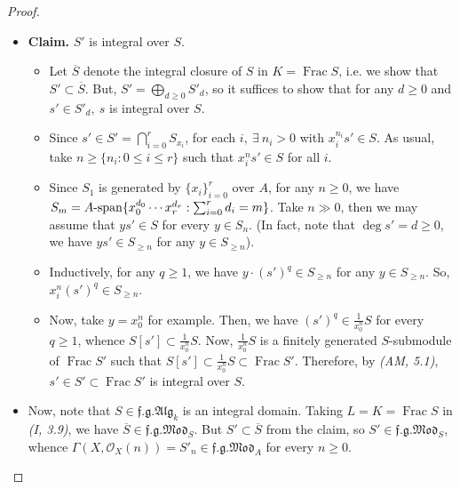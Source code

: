 \documentclass[11pt,a4paper,footinclude=true,headinclude=true]{scrbook} %
\DeclareMathOperator{\Frac}{Frac}
\newcommand{\OO}{\mathcal{O}}
\newcommand{\<}{\langle}
\newcommand{\>}{\rangle}
\newcommand{\spn}{\mathchar`-\mathrm{span}}
\newcommand{\fg}{\mathfrak{f.g.}}
\newcommand{\MOD}{\mathfrak{Mod}}
\newcommand{\ALG}{\mathfrak{Alg}}
\begin{document}
\begin{proof}
\begin{itemize}
        \begin{itemize}
            \item Clearly, from definition of $\OO_X$, every element of $S_0$ is in fact a global section of $\OO_X$, i.e. $S_0\subset\Gamma(X,\OO_X)$. In particular, $S_n\subset\Gamma(X,\OO_X(n))$ for every $n\geq0$, whence $S\subset S'$.
            \item Note that each $D_+(x_i)$ is affine, so 
            \begin{align*}
                \Gamma(X,\OO_X(n))\xhookrightarrow{}\Gamma(D_+(x_i),\OO_X(n))=\Gamma(D_+(x_i),\OO_X(n)|_{D_+(x_i)})=(S_{x_i})_n\subset S_{x_i},
            \end{align*}
            whence $S'\subset\bigoplus_{n\geq0}\bigcap_{i=0}^r(S_{x_i})_n=\bigcap_{i=0}^rS_{x_i}$.
        \end{itemize}
        \item \textbf{Claim.} $S'$ is integral over $S$.
        \begin{itemize}
            \item Let $\overline{S}$ denote the integral closure of $S$ in $K=\Frac S$, i.e. we show that $S'\subset\overline{S}$. But, $S'=\bigoplus_{d\geq0}S'_d$, so it suffices to show that for any $d\geq0$ and $s'\in S'_d,\ s$ is integral over $S$.
            \item Since $s'\in S'=\bigcap_{i=0}^rS_{x_i}$, for each $i,\ \exists\ n_i>0$ with $x_i^{n_i}s'\in S$. As usual, take $n\geq\{n_i:0\leq i\leq r\}$ such that $x_i^ns'\in S$ for all $i$.
            \item Since $S_1$ is generated by $\{x_i\}_{i=0}^r$ over $A$, for any $n\geq0$, we have $S_m=A\spn\{x_0^{d_0}\cdots x_r^{d_r}:\sum_{i=0}^rd_i=m\}$. Take $n\gg0$, then we may assume that $ys'\in S$ for every $y\in S_n$. (In fact, note that $\deg s'=d\geq0$, we have $ys'\in S_{\geq n}$ for any $y\in S_{\geq n}$).
            \item Inductively, for any $q\geq1$, we have $y\cdot(s')^q\in S_{\geq n}$ for any $y\in S_{\geq n}$. So, $x_i^n(s')^q\in S_{\geq n}$.
            \item Now, take $y=x_0^n$ for example. Then, we have $(s')^q\in\frac{1}{x_0^n}S$ for every $q\geq1$, whence $S[s']\subset\frac{1}{x_0^n}S$. Now, $\frac{1}{x_0^n}S$ is a finitely generated $S$-submodule of $\Frac S'$ such that $S[s']\subset\frac{1}{x_0^n}S\subset\Frac S'$. Therefore, by \textit{(AM, 5.1)}, $s'\in S'\subset\Frac S'$ is integral over $S$.  
        \end{itemize}
        \item Now, note that $S\in\fg\ALG_k$ is an integral domain. Taking $L=K=\Frac S$ in \textit{(I, 3.9)}, we have $\overline{S}\in\fg\MOD_S$. But $S'\subset\overline{S}$ from the claim, so $S'\in\fg\MOD_S$, whence $\Gamma(X,\OO_X(n))=S'_n\in\fg\MOD_A$ for every $n\geq0$.
    \end{itemize}
\end{proof}
\end{document}
